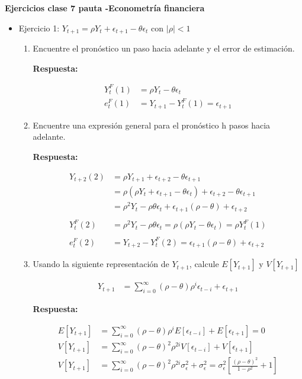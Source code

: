 \documentclass[12pt,letterpaper]{article}
\begin{document}
\begin{center}
\large\textbf{Ejercicios clase 7 pauta -Econometr\'ia financiera}
\end{center}

\begin{itemize}
\item Ejercicio 1: $Y_{t+1} = \rho Y_t + \epsilon_{t+1} - \theta \epsilon_t$ con $|\rho| < 1$

\begin{enumerate}
\item Encuentre el pron\'ostico un paso hacia adelante y el error de estimaci\'on.

\textbf{Respuesta:}

\begin{align*}
Y_t^F (1)&= \rho Y_t - \theta \epsilon_t \\
e_t^F (1)&= Y_{t+1} - Y_t^F (1) = \epsilon_{t+1}
\end{align*}

\item Encuentre una expresi\'on general para el pron\'ostico h pasos hacia adelante.

\textbf{Respuesta:}

\begin{align*}
Y_{t+2} (2)&= \rho Y_{t+1} + \epsilon_{t+2} - \theta\epsilon_{t+1}\\
&= \rho ( \rho Y_t + \epsilon_{t+1} - \theta \epsilon_t) + \epsilon_{t+2} - \theta\epsilon_{t+1} \\
&= \rho^2 Y_t - \rho\theta \epsilon_t +\epsilon_{t+1}(\rho - \theta) + \epsilon_{t+2} \\
& \\
Y_t^F (2)&= \rho^2 Y_t - \rho \theta \epsilon_t = \rho (\rho Y_t - \theta \epsilon_t) = \rho Y_t^F (1)\\
& \\
e_t^F (2)&= Y_{t+2} - Y_t^F (2) = \epsilon_{t+1}(\rho -\theta) + \epsilon_{t+2}
\end{align*}



\item Usando la siguiente representaci\'on de $Y_{t+1}$, calcule $E[Y_{t+1}]$ y $V[Y_{t+1}]$

\begin{align*}
Y_{t+1} &= \sum_{i=0}^\infty (\rho - \theta) \rho^i \epsilon_{t-i}+\epsilon_{t+1}
\end{align*}

\textbf{Respuesta:}

\begin{align*}
E[Y_{t+1}] &= \sum_{i=0}^\infty (\rho - \theta) \rho^i E[\epsilon_{t-i}]+E[\epsilon_{t+1}] = 0 \\
V[Y_{t+1}] &= \sum_{i=0}^\infty (\rho - \theta)^2 \rho^{2i} V[\epsilon_{t-i}]+V[\epsilon_{t+1}] \\
V[Y_{t+1}] &= \sum_{i=0}^\infty (\rho - \theta)^2 \rho^{2i} \sigma_\epsilon^2+\sigma_\epsilon^2 = \sigma_\epsilon^2 \left[ \frac{(\rho - \theta)^2}{1-\rho^2} + 1 \right]
\end{align*}


\end{enumerate}
\end{itemize}
\end{document}
